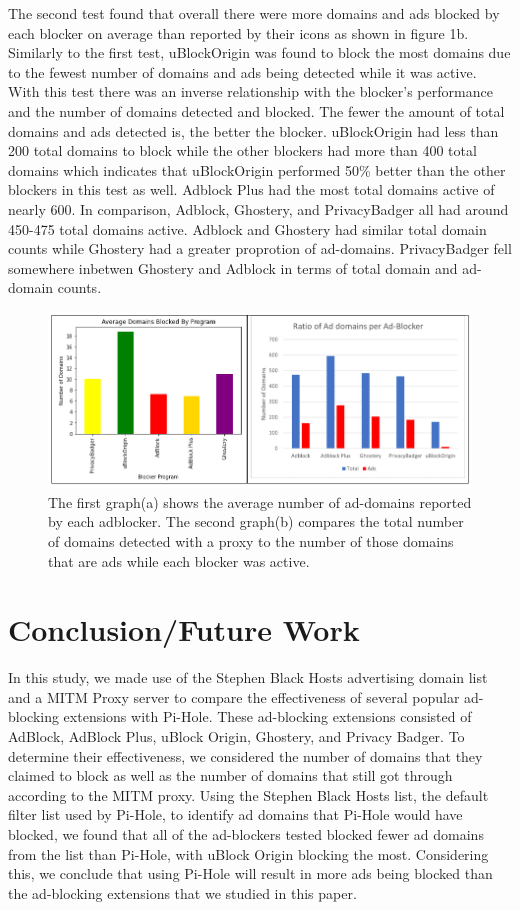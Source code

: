 \documentclass[sigsmall]{acmart}
\begin{document}
The second test found that overall there were more domains and ads blocked by each blocker on average than reported by their icons as shown in figure 1b. Similarly to the first test, uBlockOrigin was found to block the most domains due to the fewest number of domains and ads being detected while it was active. With this test there was an inverse relationship with the blocker's performance and the number of domains detected and blocked. The fewer the amount of total domains and ads detected is, the better the blocker. uBlockOrigin had less than 200 total domains to block while the other blockers had more than 400 total domains which indicates that uBlockOrigin performed 50\% better than the other blockers in this test as well. Adblock Plus had the most total domains active of nearly 600. In comparison, Adblock, Ghostery, and PrivacyBadger all had around 450-475 total domains active. Adblock and Ghostery had similar total domain counts while Ghostery had a greater proprotion of ad-domains. PrivacyBadger fell somewhere inbetwen Ghostery and Adblock in terms of total domain and ad-domain counts.   
\begin{figure}[h]
  \includegraphics[scale = 0.75]{Edit3.png}
  \caption{ The first graph(a) shows the average number of ad-domains reported by each adblocker. The second graph(b) compares the total number of domains detected with a proxy to the number of those domains that are ads while each blocker was active.}
  \label{fig:graph1ab}
\end{figure}

\section*{Conclusion/Future Work}
In this study, we made use of the Stephen Black Hosts advertising domain list and a MITM Proxy server to compare the effectiveness of several popular ad-blocking extensions with Pi-Hole. These ad-blocking extensions consisted of AdBlock, AdBlock Plus, uBlock Origin, Ghostery, and Privacy Badger. To determine their effectiveness, we considered the number of domains that they claimed to block as well as the number of domains that still got through according to the MITM proxy. Using the Stephen Black Hosts list, the default filter list used by Pi-Hole, to identify ad domains that Pi-Hole would have blocked, we found that all of the ad-blockers tested blocked fewer ad domains from the list than Pi-Hole, with uBlock Origin blocking the most. Considering this, we conclude that using Pi-Hole will result in more ads being blocked than the ad-blocking extensions that we studied in this paper.



\end{document}
